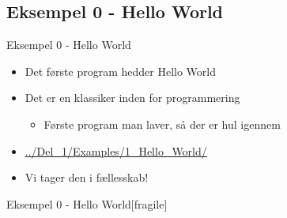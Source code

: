 \documentclass{beamer}
\begin{document}
\subsection{Eksempel 0 - Hello World}
\begin{frame}{Eksempel 0 - Hello World}
	\begin{itemize}
	\item{Det første program hedder Hello World}
	\item{Det er en klassiker inden for programmering}
		\begin{itemize}
		\item{Første program man laver, så der er hul igennem}
		\end{itemize}
	\item{\href{https://github.com/Iakop/C-Programmering-for-begyndere/tree/master/Del_1/Examples/1_Hello_World/}{../Del\_1/Examples/1\_Hello\_World/}}
	\item{Vi tager den i fællesskab!}
	\end{itemize}
\end{frame}

\begin{frame}{Eksempel 0 - Hello World}[fragile]
	\begin{lstlisting}
	
	\end{lstlisting}
\end{frame}
\end{document}
